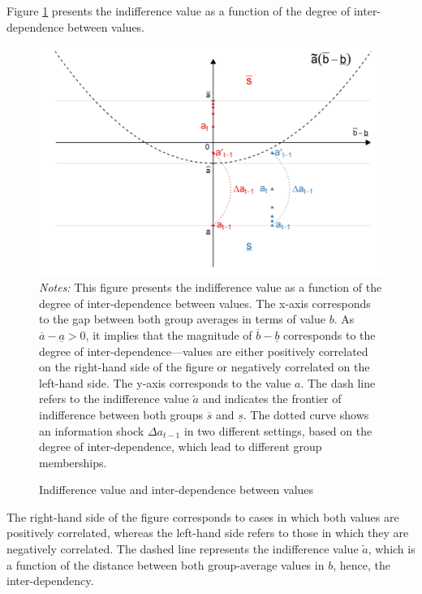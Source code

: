 Figure \ref{chap3-fig:theory-shift-a} presents the indifference value as a function of the degree of inter-dependence between values.
\begin{figure}[!tb]
    \centering
    \caption{Indifference value and inter-dependence between values}
    \label{chap3-fig:theory-shift-a}
    \includegraphics[width=\linewidth]{chap3/graphic/theory-shift-a.png}
	\vspace{-3em}
	\justify\singlespacing\footnotesize{\textit{Notes:} This figure presents the indifference value as a function of the degree of inter-dependence between values. The x-axis corresponds to the gap between both group averages in terms of value $b$. As $\overline{a}-\underline{a} > 0$, it implies that the magnitude of $\overline{b}-\underline{b}$ corresponds to the degree of inter-dependence---values are either positively correlated on the right-hand side of the figure or negatively correlated on the left-hand side.
	The y-axis corresponds to the value $a$. 
	The dash line refers to the indifference value $\widetilde{a}$ and indicates the frontier of indifference between both groups $\overline{s}$ and $\underline{s}$. The dotted curve shows an information shock $\Delta a_{t-1}$ in two different settings, based on the degree of inter-dependence, which lead to different group memberships.}
\end{figure}
The right-hand side of the figure corresponds to cases in which both values are positively correlated, whereas the left-hand side refers to those in which they are negatively correlated. The dashed line represents the indifference value $\widetilde{a}$, which is a function of the distance between both group-average values in $b$, hence, the inter-dependency.

